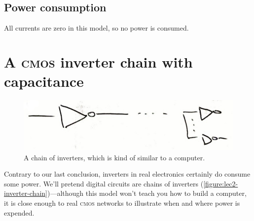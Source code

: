 \subsection{Power consumption}
All currents are zero in this model, so no power is consumed.

\section{A \textsc{cmos} inverter chain with capacitance}
\begin{figure}
  \centering
  \includegraphics[width=0.75\linewidth]{figures/inverter-chain}
  \caption{A chain of inverters, which is kind of similar to a computer.}
  \label{figure:lec2-inverter-chain}
\end{figure}
Contrary to our last conclusion, inverters in real electronics certainly do consume some power.
We'll pretend digital circuits are chains of inverters (\autoref{figure:lec2-inverter-chain})---although this model won't teach you how to build a computer, it is close enough to real \textsc{cmos} networks to illustrate when and where power is expended.

